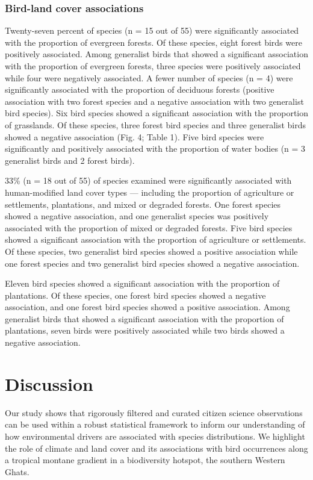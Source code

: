 \subsubsection*{Bird-land cover associations}

Twenty-seven percent of species (n = 15 out of 55) were significantly associated with the proportion of evergreen forests.
Of these species, eight forest birds were positively associated.
Among generalist birds that showed a significant association with the proportion of evergreen forests, three species were positively associated while four were negatively associated.
A fewer number of species (n = 4) were significantly associated with the proportion of deciduous forests (positive association with two forest species and a negative association with two generalist bird species).
Six bird species showed a significant association with the proportion of grasslands.
Of these species, three forest bird species and three generalist birds showed a negative association (Fig.
4; Table 1).
Five bird species were significantly and positively associated with the proportion of water bodies (n = 3 generalist birds and 2 forest birds).

33\% (n = 18 out of 55) of species examined were significantly associated with human-modified land cover types --- including the proportion of agriculture or settlements, plantations, and mixed or degraded forests.
One forest species showed a negative association, and one generalist species was positively associated with the proportion of mixed or degraded forests.
Five bird species showed a significant association with the proportion of agriculture or settlements.
Of these species, two generalist bird species showed a positive association while one forest species and two generalist bird species showed a negative association.

Eleven bird species showed a significant association with the proportion of plantations.
Of these species, one forest bird species showed a negative association, and one forest bird species showed a positive association.
Among generalist birds that showed a significant association with the proportion of plantations, seven birds were positively associated while two birds showed a negative association.

\section*{Discussion}

Our study shows that rigorously filtered and curated citizen science observations can be used within a robust statistical framework to inform our understanding of how environmental drivers are associated with species distributions.
We highlight the role of climate and land cover and its associations with bird occurrences along a tropical montane gradient in a biodiversity hotspot, the southern Western Ghats.

